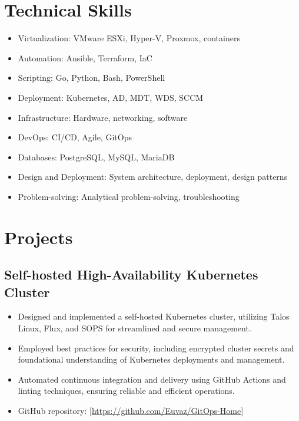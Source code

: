 \documentclass[a4paper]{article}
\begin{document}
\section{Technical Skills}
\begin{minipage}{\textwidth}
\begin{itemize}
    \item Virtualization: VMware ESXi, Hyper-V, Proxmox, containers
    \item Automation: Ansible, Terraform, IaC
    \item Scripting: Go, Python, Bash, PowerShell
    \item Deployment: Kubernetes, AD, MDT, WDS, SCCM
    \item Infrastructure: Hardware, networking, software
    \item DevOps: CI/CD, Agile, GitOps
    \item Databases: PostgreSQL, MySQL, MariaDB
    \item Design and Deployment: System architecture, deployment, design patterns
    \item Problem-solving: Analytical problem-solving, troubleshooting
\end{itemize}
\end{minipage}

\section{Projects}
\subsection{Self-hosted High-Availability Kubernetes Cluster}
\begin{itemize}
    \item Designed and implemented a self-hosted Kubernetes cluster, utilizing Talos Linux, Flux, and SOPS for streamlined and secure management.
    \item Employed best practices for security, including encrypted cluster secrets and foundational understanding of Kubernetes deployments and management.
    \item Automated continuous integration and delivery using GitHub Actions and linting techniques, ensuring reliable and efficient operations.
    \item GitHub repository: [\url{https://github.com/Euvaz/GitOps-Home}]
\end{itemize}
\end{document}
